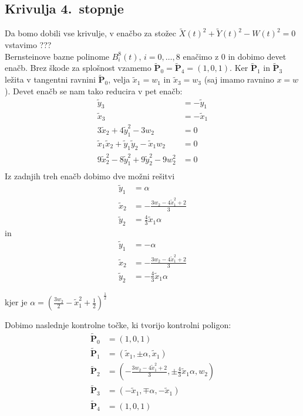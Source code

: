 \documentclass[a4paper,11pt]{article}
\theoremstyle{definition}
\theoremstyle{plain}
\begin{document}

\subsection{Krivulja 4.~stopnje}
Da bomo dobili vse krivulje, v enačbo za stožec $\tilde{X}(t)^2+\tilde{Y}(t)^2-W(t)^2=0$ vstavimo ??? \\
Bernsteinove bazne polinome $B_i^8(t),\,i=0,\ldots,8$ enačimo z $0$ in dobimo devet enačb.
Brez škode za splošnost vzamemo $\boldsymbol{\tilde{P}}_0 =\boldsymbol{\tilde{P}}_4 = (1,0,1)$. Ker $\boldsymbol{\tilde{P}}_1$ in $\boldsymbol{\tilde{P}}_3$ ležita v tangentni ravnini $\boldsymbol{\tilde{P}}_0$, velja $\tilde{x}_1=w_1$ in $\tilde{x}_3=w_3$ (saj imamo ravnino $x=w$). Devet enačb se nam tako reducira v pet enačb:
\begin{align*}
\tilde{y}_3 &=- \tilde{y}_1 \\
\tilde{x}_3 &= - \tilde{x}_1 \\
3\tilde{x}_2 + 4\tilde{y}_1^2 - 3w_2 &= 0 \\
\tilde{x}_1\tilde{x}_2 + \tilde{y}_1\tilde{y}_2  - \tilde{x}_1w_2 &= 0 \\
9\tilde{x}_2^2 - 8\tilde{y}_1^2 + 9\tilde{y}_2^2 - 9w_2^2&= 0 \\
\end{align*}
Iz zadnjih treh enačb dobimo dve možni rešitvi
\begin{align*}
\tilde{y}_1 &= \alpha \\
\tilde{x}_2 &=-\frac{3w_2-4\tilde{x}_1^2+2}{3}\\
\tilde{y}_2 &= \frac{4}{3}\tilde{x}_1\alpha
\end{align*}
in
\begin{align*}
\tilde{y}_1 &= -\alpha \\
\tilde{x}_2 &=-\frac{3w_2-4\tilde{x}_1^2+2}{3}\\
\tilde{y}_2 &= -\frac{4}{3}\tilde{x}_1\alpha
\end{align*}

kjer je $\alpha=(\frac{3w_2}{2}-\tilde{x}_1^2+\frac{1}{2})^{\frac{1}{2}}$

Dobimo naslednje kontrolne točke, ki tvorijo kontrolni poligon:
\begin{align*}
\boldsymbol{\tilde{P}}_0 &= (1,0,1) \\
\boldsymbol{\tilde{P}}_1 &= (\tilde{x}_1,\pm\alpha,\tilde{x}_1) \\
\boldsymbol{\tilde{P}}_2 &= (-\frac{3w_2-4\tilde{x}_1^2+2}{3},\pm\frac{4}{3}\tilde{x}_1\alpha,w_2) \\
\boldsymbol{\tilde{P}}_3 &= (-\tilde{x}_1,\mp\alpha,-\tilde{x}_1) \\
\boldsymbol{\tilde{P}}_4 &= (1,0,1)
\end{align*}
\end{document}
